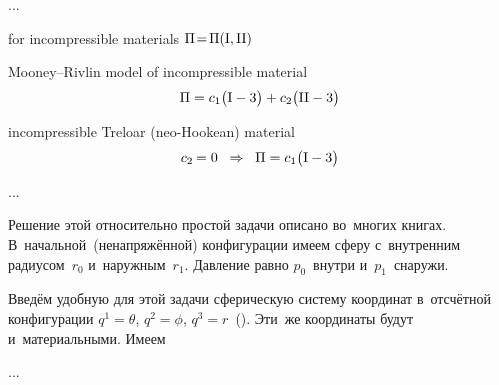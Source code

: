 ...



for incompressible materials
${\Pi \hspace{-0.4ex} = \hspace{-0.33ex} \Pi (\mathrm{I}, \mathrm{II})}$

Mooney\hbox{--}Rivlin model of incompressible material
\[
\Pi = c_1 \bigl( \mathrm{I} - 3 \bigr) + c_2 \bigl( \mathrm{II} - 3 \bigr)
\]

incompressible Treloar (neo-Hookean) material
\[
c_2 \hspace{-0.16ex} = 0
\;\;\Rightarrow\;\;
\Pi = c_1 \bigl( \mathrm{I} - 3 \bigr)
\]


...





\label{section:hollowsphereunderpressure}

\begin{otherlanguage}{russian}

Решение этой относительно простой задачи описано во~многих книгах.
В~начальной~(ненапряжённой) конфигурации имеем сферу с~внутренним радиусом~${r_0}$ и~наружным~${r_1}$.
Давление равно $p_0$~внутри и~$p_1$~снаружи.

Введём удобную для этой задачи сферическую систему координат в~отсчётной конфигурации ${q^1 = \theta}$, ${q^2 = \phi}$, ${q^3 = r}$~().
Эти~же координаты будут и~материальными.
Имеем

...

\end{otherlanguage}

\newpage



